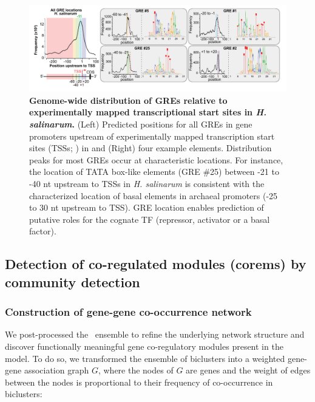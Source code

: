 \begin{figure}[h!]
\centering
\includegraphics[width=0.95\linewidth]{figures/gre_global_locs_hal.pdf}
\caption[Genome-wide distribution of GREs relative to experimentally mapped transcriptional start sites in \textit{H. salinarum}]{\textbf{Genome-wide distribution of GREs relative to experimentally mapped transcriptional start sites in \textit{H. salinarum}.}  (Left) Predicted positions for all GREs in gene promoters upstream of experimentally mapped transcription start sites (TSSs; \cite{koide_prevalence_2009}) in and (Right) four example elements. Distribution peaks for most GREs occur at characteristic locations. For instance, the location of TATA box-like elements (GRE \#25) between -21 to -40 nt upstream to TSSs in {\it H. salinarum} is consistent with the characterized location of basal elements in archaeal promoters (-25 to 30 nt upstream to TSS). GRE location enables prediction of putative roles for the cognate TF (\eg repressor, activator or a basal factor).} 
\label{fig:gre_global_locs_hal}
\end{figure}

\subsection{Detection of co-regulated modules (corems) by community detection}

\subsubsection{Construction of gene-gene co-occurrence network}
\label{section:gBg}

We post-processed the \egrine~ensemble to refine the underlying network structure and discover functionally meaningful gene co-regulatory modules present in the model. To do so, we transformed the ensemble of biclusters into a weighted gene-gene association graph $G$, where the nodes of $G$ are genes and the weight of edges between the nodes is proportional to their frequency of co-occurrence in biclusters:

